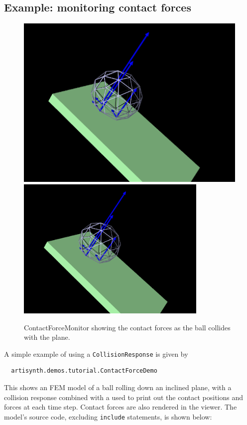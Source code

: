 \subsection{Example: monitoring contact forces}

\begin{figure}[ht]
\begin{center}
\iflatexml
 \includegraphics[]{images/ContactForceMonitor}
\else
 \includegraphics[width=3.6in]{images/ContactForceMonitor}
\fi
\end{center}
\caption {ContactForceMonitor showing the contact forces as
the ball collides with the plane.}
\label{ContactForceMonitor:fig}
\end{figure}

A simple example of using a {\tt CollisionResponse} is given by
%
\begin{verbatim}
  artisynth.demos.tutorial.ContactForceDemo
\end{verbatim}
%
This shows an FEM model of a ball rolling down an inclined plane,
with a collision response combined with a 
used to print out the contact positions and forces at each time step.
Contact forces are also rendered in the viewer.  The model's source
code, excluding {\tt include} statements, is shown below:

